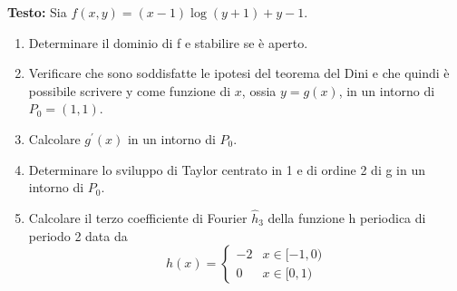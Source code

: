 \documentclass[12pt, a4paper]{article}
\begin{document}
\textbf{Testo:} Sia $f(x,y) = (x-1)\log(y+1) + y - 1$.
\begin{enumerate}
    \item Determinare il dominio di f e stabilire se è aperto.
    \item Verificare che sono soddisfatte le ipotesi del teorema del Dini e che quindi è possibile scrivere y come funzione di $x$, ossia $y=g(x)$, in un intorno di $P_{0}=(1,1)$.
    \item Calcolare $g^{\prime}(x)$ in un intorno di $P_{0}$.
    \item Determinare lo sviluppo di Taylor centrato in 1 e di ordine 2 di g in un intorno di $P_{0}$.
    \item Calcolare il terzo coefficiente di Fourier $\hat{h}_{3}$ della funzione h periodica di periodo 2 data da
    \[ h(x) = \begin{cases} -2 & x \in [-1,0) \\ 0 & x \in [0,1) \end{cases} \]
\end{enumerate}
\end{document}
